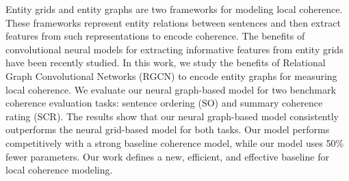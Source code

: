 Entity grids and entity graphs are two frameworks for modeling local coherence. These frameworks represent entity relations between sentences and then extract features from such representations to encode coherence. The benefits of convolutional neural models for extracting informative features from entity grids have been recently studied.   In this work, we study the benefits of Relational Graph Convolutional Networks (RGCN) to encode entity graphs for measuring local coherence. We evaluate our neural graph-based model for two benchmark coherence evaluation tasks: sentence ordering (SO) and summary coherence rating (SCR). The results show that our neural graph-based model consistently outperforms the neural grid-based model for both tasks.  Our model performs competitively with a strong baseline coherence model, while our model uses 50\% fewer parameters.  Our work defines a new, efficient, and effective baseline for local coherence modeling.
